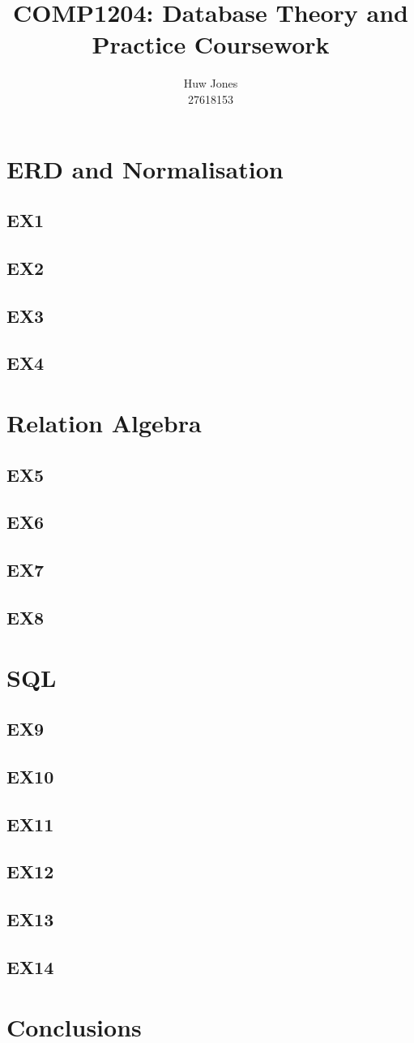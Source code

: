 \documentclass[a4paper]{article}
\author{Huw Jones \\27618153}
\title{COMP1204: Database Theory and Practice Coursework}
\begin{document}
\maketitle
\newpage

\section{ERD and Normalisation}
\subsection{EX1}
\subsection{EX2}
\subsection{EX3}
\subsection{EX4}

\section{Relation Algebra}
\subsection{EX5}
\subsection{EX6}
\subsection{EX7}
\subsection{EX8}

\section{SQL}
\subsection{EX9}
\subsection{EX10}
\subsection{EX11}
\subsection{EX12}
\subsection{EX13}
\subsection{EX14}

\section{Conclusions}
\end{document}
